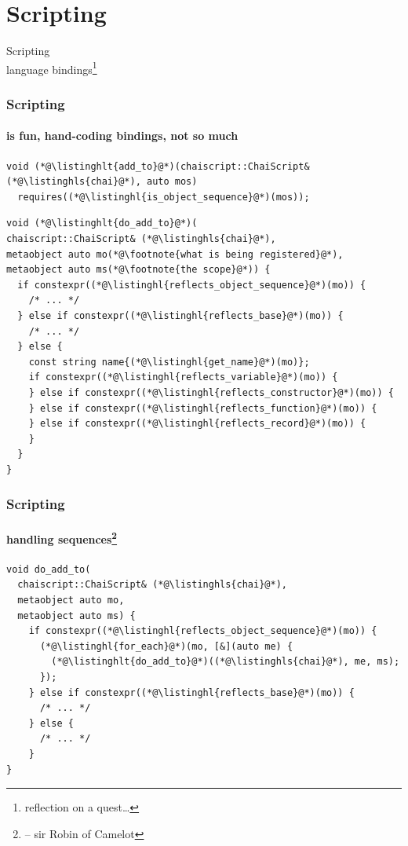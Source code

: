 \documentclass[compress,table,xcolor=table]{beamer}
\begin{document}
\section{Scripting}
\begin{frame}[c]
  \Huge
  \centering
  Scripting\\
  \Large
  language bindings\footnote{reflection on a quest\ldots}
  
\end{frame}
\begin{frame}[fragile]
  \frametitle{Scripting}
  \framesubtitle{is fun, hand-coding bindings, not so much}
  \begin{lstlisting}[language=c++2x,basicstyle=\footnotesize\ttfamily]
void (*@\listinghlt{add_to}@*)(chaiscript::ChaiScript& (*@\listinghls{chai}@*), auto mos)
  requires((*@\listinghl{is_object_sequence}@*)(mos));
  \end{lstlisting}
  \begin{lstlisting}[language=c++2x,basicstyle=\scriptsize\ttfamily]
void (*@\listinghlt{do_add_to}@*)(
chaiscript::ChaiScript& (*@\listinghls{chai}@*),
metaobject auto mo(*@\footnote{what is being registered}@*),
metaobject auto ms(*@\footnote{the scope}@*)) {
  if constexpr((*@\listinghl{reflects_object_sequence}@*)(mo)) {
    /* ... */
  } else if constexpr((*@\listinghl{reflects_base}@*)(mo)) {
    /* ... */
  } else {
    const string name{(*@\listinghl{get_name}@*)(mo)};
    if constexpr((*@\listinghl{reflects_variable}@*)(mo)) {
    } else if constexpr((*@\listinghl{reflects_constructor}@*)(mo)) {
    } else if constexpr((*@\listinghl{reflects_function}@*)(mo)) {
    } else if constexpr((*@\listinghl{reflects_record}@*)(mo)) {
    }
  }
}
  \end{lstlisting}
\end{frame}
\begin{frame}[fragile]
  \frametitle{Scripting}
  \framesubtitle{handling sequences\footnote{ -- sir Robin of Camelot}}
  \begin{lstlisting}[language=c++2x,basicstyle=\small\ttfamily]
void do_add_to(
  chaiscript::ChaiScript& (*@\listinghls{chai}@*),
  metaobject auto mo,
  metaobject auto ms) {
    if constexpr((*@\listinghl{reflects_object_sequence}@*)(mo)) {
      (*@\listinghl{for_each}@*)(mo, [&](auto me) {
        (*@\listinghlt{do_add_to}@*)((*@\listinghls{chai}@*), me, ms);
      });
    } else if constexpr((*@\listinghl{reflects_base}@*)(mo)) {
      /* ... */
    } else {
      /* ... */
    }
}
  \end{lstlisting}
\end{frame}
\end{document}
